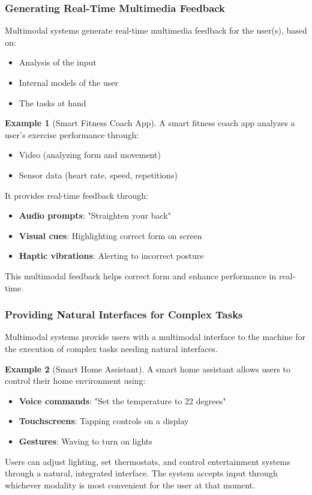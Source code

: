 \documentclass[11pt,a4paper]{article}
\theoremstyle{definition}
\newtheorem{example}{Example}[section]
\theoremstyle{plain}
\theoremstyle{remark}
\begin{document}
\subsubsection{Generating Real-Time Multimedia Feedback}

Multimodal systems generate real-time multimedia feedback for the user(s), based on:

\begin{itemize}
    \item Analysis of the input
    \item Internal models of the user
    \item The tasks at hand
\end{itemize}

\begin{example}[Smart Fitness Coach App]
A smart fitness coach app analyzes a user's exercise performance through:
\begin{itemize}
    \item Video (analyzing form and movement)
    \item Sensor data (heart rate, speed, repetitions)
\end{itemize}

It provides real-time feedback through:
\begin{itemize}
    \item \textbf{Audio prompts}: "Straighten your back"
    \item \textbf{Visual cues}: Highlighting correct form on screen
    \item \textbf{Haptic vibrations}: Alerting to incorrect posture
\end{itemize}

This multimodal feedback helps correct form and enhance performance in real-time.
\end{example}

\subsubsection{Providing Natural Interfaces for Complex Tasks}

Multimodal systems provide users with a multimodal interface to the machine for the execution of complex tasks needing natural interfaces.

\begin{example}[Smart Home Assistant]
A smart home assistant allows users to control their home environment using:
\begin{itemize}
    \item \textbf{Voice commands}: "Set the temperature to 22 degrees"
    \item \textbf{Touchscreens}: Tapping controls on a display
    \item \textbf{Gestures}: Waving to turn on lights
\end{itemize}

Users can adjust lighting, set thermostats, and control entertainment systems through a natural, integrated interface. The system accepts input through whichever modality is most convenient for the user at that moment.
\end{example}
\end{document}
